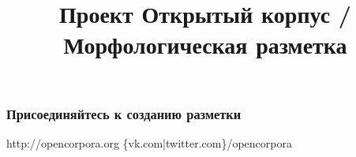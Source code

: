 \documentclass{beamer}
\title{Проект Открытый корпус / Морфологическая разметка}
\begin{document}
\begin{frame}
\frametitle{Присоединяйтесь к созданию разметки}
\large{http://opencorpora.org}
\hspace{1.4cm}
\small{\color{gray}\{vk.com|twitter.com\}/opencorpora}
\begin{figure}
\end{figure}
\end{frame}
\end{document}
